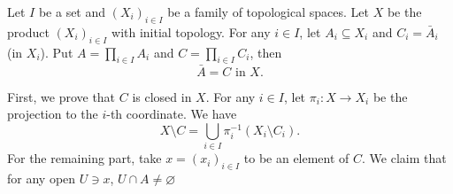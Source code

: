 \begin{propositionenv}\label{thm:closure_pi_set}
    Let $I$ be a set and $(X_i)_{i\in I}$ be a family of topological spaces.
    Let $X$ be the product $(X_i)_{i\in I}$ with initial topology.
    For any $i\in I$, let $A_i \subseteq X_i$ and $C_i = \bar{A}_i$ (in $X_i$).
    Put $A = \prod_{i\in I}A_i$ and $C = \prod_{i\in I}C_i$,
    then
    $$ \bar{A} = C \text{ in } X.$$
\end{propositionenv}
\begin{proofenv}
    First, we prove that $C$ is closed in $X$.
    For any $i\in I$, let $\pi_i : X \rightarrow X_i$ be the projection to the $i$-th coordinate.
    We have
    $$ X\setminus C = \bigcup_{i \in I} \pi_i^{-1}\left(X_i \setminus C_i\right).$$
    For the remaining part, take $x = (x_i)_{i \in I}$ to be an element of $C$.
    We claim that for any open $U \ni x$, $U \cap A \neq \varnothing$
    \begin{center}
        

 
\tikzset{
pattern size/.store in=\mcSize, 
pattern size = 5pt,
pattern thickness/.store in=\mcThickness, 
pattern thickness = 0.3pt,
pattern radius/.store in=\mcRadius, 
pattern radius = 1pt}
\makeatletter
{}
\makeatother
{} %

\begin{tikzpicture}[x=0.75pt,y=0.75pt,yscale=-1,xscale=1]


\end{tikzpicture}
\end{center}
\end{proofenv}
